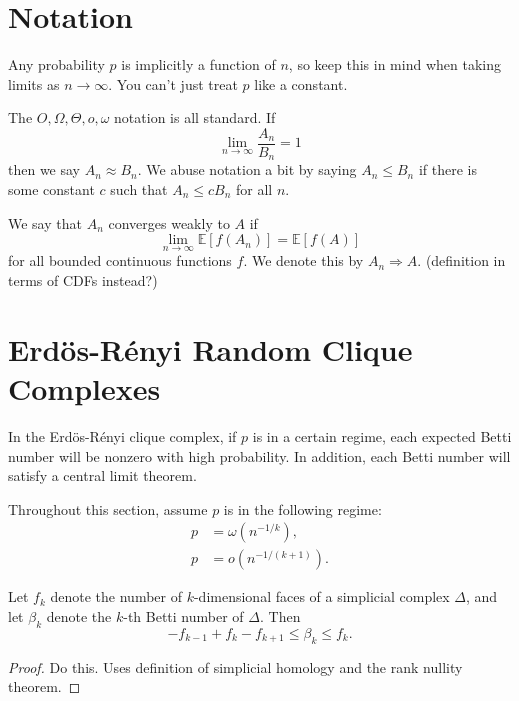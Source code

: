 \documentclass[twoside,10pt]{report}
\begin{document}


\section{Notation}

Any probability $p$ is implicitly a function of $n$, so keep this in mind when taking limits as $n\to \infty$. You can't just treat $p$ like a constant.

The $O,\Omega,\Theta,o,\omega$ notation is all standard. If
\[
\lim_{n \to \infty} \frac{A_{n}}{B_{n}} =1
\] then we say $A_{n} \approx B_{n}$. We abuse notation a bit by saying $A_{n} \leq B_{n}$ if there is some constant $c$ such that $A_{n} \leq c B_{n}$ for all $n$.

We say that $A_n$ converges weakly to $A$ if
\[
	\lim_{n \to \infty} \mathbb{E}\left[ f(A_{n}) \right]=\mathbb{E}\left[ f(A) \right]
\] for all bounded continuous functions $f$. We denote this by $A_{n}\Rightarrow A$. {\color{red}(definition in terms of CDFs instead?)}


\section{Erd\"os-R\'enyi Random Clique Complexes}

\begin{imp}
In the Erd\"os-R\'enyi clique complex, if $p$ is in a certain regime, each expected Betti number will be nonzero with high probability. In addition, each Betti number will satisfy a central limit theorem.
\end{imp}

\begin{note}[]
Throughout this section, assume $p$ is in the following regime:
\begin{align*}
	p&=\omega(n^{-1/k}),\\
	p&=o(n^{-1/(k+1)}).
\end{align*}
\end{note}

\begin{lem}
	Let $f_{k}$ denote the number of $k$-dimensional faces of a simplicial complex $\Delta$, and let $\beta_{k}$ denote the $k$-th Betti number of $\Delta$. Then
	\[
	-f_{k-1}+f_{k}-f_{k+1} \leq \beta_{k} \leq f_{k}.
	\] 
\end{lem}
\begin{proof}
	{\color{red}Do this. Uses definition of simplicial homology and the rank nullity theorem.}
\end{proof}
\end{document}
